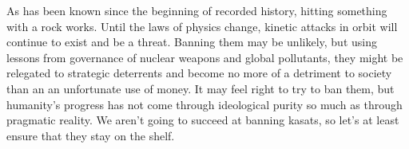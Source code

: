 As has been known since the beginning of recorded history, hitting
something with a rock works.  Until the laws of physics change,
kinetic attacks in orbit will continue to exist and be a threat.
Banning them may be unlikely, but using lessons from governance of
nuclear weapons and global pollutants, they might be relegated to
strategic deterrents and become no more of a detriment to society than
an an unfortunate use of money.  It may feel right to try to ban them,
but humanity's progress has not come through ideological purity so
much as through pragmatic reality.  We aren't going to succeed at
banning \aclp{kasat}, so let's at least ensure that they stay on the
shelf.

